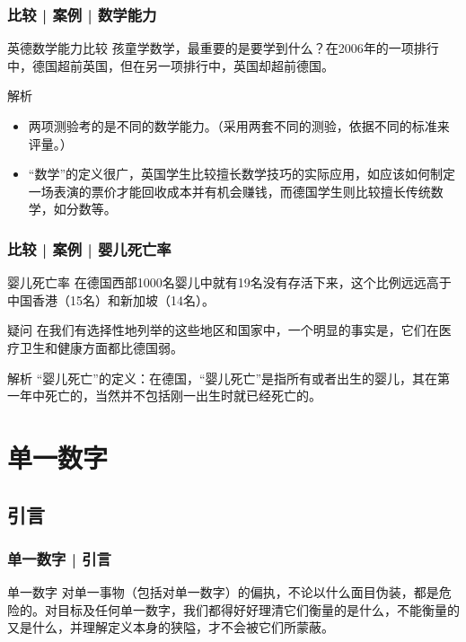 \begin{frame}
  \frametitle{比较 | 案例 | 数学能力}
  \begin{block}{英德数学能力比较}
    孩童学数学，最重要的是要学到什么？在2006年的一项排行中，德国超前英国，但在另一项排行中，英国却超前德国。
  \end{block}
  \pause
  \begin{block}{解析}
    \begin{itemize}
      \item 两项测验考的是不同的数学能力。（采用两套不同的测验，依据不同的标准来评量。）
      \item “数学”的定义很广，英国学生比较擅长数学技巧的实际应用，如应该如何制定一场表演的票价才能回收成本并有机会赚钱，而德国学生则比较擅长传统数学，如分数等。
    \end{itemize}
  \end{block}
\end{frame}

\begin{frame}
  \frametitle{比较 | 案例 | 婴儿死亡率}
  \begin{block}{婴儿死亡率}
    在德国西部1000名婴儿中就有19名没有存活下来，这个比例远远高于中国香港（15名）和新加坡（14名）。
  \end{block}
  \pause
  \begin{block}{疑问}
    在我们有选择性地列举的这些地区和国家中，一个明显的事实是，它们在医疗卫生和健康方面都比德国弱。
  \end{block}
  \pause
  \begin{block}{解析}
    “婴儿死亡”的定义：在德国，“婴儿死亡”是指所有或者出生的婴儿，其在第一年中死亡的，当然并不包括刚一出生时就已经死亡的。
  \end{block}
\end{frame}

\section{单一数字}
\subsection{引言}
\begin{frame}
  \frametitle{单一数字 | 引言}
  \begin{block}{单一数字}
对单一事物（包括对单一数字）的偏执，不论以什么面目伪装，都是危险的。对目标及任何单一数字，我们都得好好理清它们衡量的是什么，不能衡量的又是什么，并理解定义本身的狭隘，才不会被它们所蒙蔽。
  \end{block}
\end{frame}

